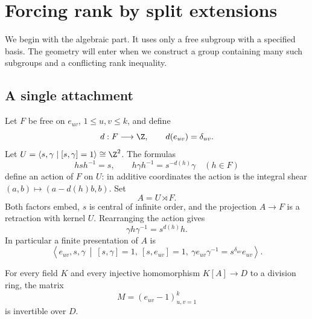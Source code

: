 \section{Forcing rank by split extensions}\label{sec:rank}

We begin with the algebraic part. It uses only a free subgroup with a
specified basis. The geometry will enter when we construct a group
containing many such subgroups and a conflicting rank inequality.

\subsection{A single attachment}

Let \(F\) be free on \(e_{uv}\), \(1\le u,v\le k\), and define
\[
 d:F\longrightarrow\Z,\qquad d(e_{uv})=\delta_{uv}.
\]
Let \(U=\langle s,\gamma\mid[s,\gamma]=1\rangle\cong\Z^2\).
The formulas
\[
 hsh^{-1}=s,\qquad h\gamma h^{-1}=s^{-d(h)}\gamma
 \quad(h\in F)
\]
define an action of \(F\) on \(U\): in additive coordinates the action
is the integral shear \((a,b)\mapsto(a-d(h)b,b)\).
Set
\begin{equation}\label{eq:attachment}
 A=U\rtimes F.
\end{equation}
Both factors embed, \(s\) is central of infinite order, and the projection
\(A\to F\) is a retraction with kernel \(U\).
Rearranging the action gives
\begin{equation}\label{eq:shear}
 \gamma h\gamma^{-1}=s^{d(h)}h.
\end{equation}
In particular a finite presentation of \(A\) is
\begin{equation}\label{eq:attachment-presentation}
 \left\langle e_{uv},s,\gamma\ \middle|\
 [s,\gamma]=1,\ [s,e_{uv}]=1,\
 \gamma e_{uv}\gamma^{-1}=s^{\delta_{uv}}e_{uv}
 \right\rangle.
\end{equation}

\begin{lemma}\label{lem:rank-forcing}
For every field \(K\) and every injective homomorphism \(K[A]\to D\)
to a division ring, the matrix
\[
 M=(e_{uv}-1)_{u,v=1}^{k}
\]
is invertible over \(D\).
\end{lemma}

